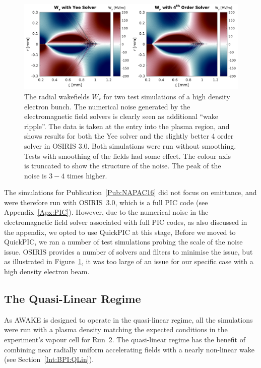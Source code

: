 \begin{figure}[hbt]
    \centering
    \includegraphics[width=0.999\linewidth]{figures/EMFSolverNoise}
    \caption{\label{Fig:SimA:EMFNoise}
        The radial wakefields $W_r$ for two test simulations of a high density electron bunch.
        The numerical noise generated by the electromagnetic field solvers is clearly seen as additional ``wake ripple''.
        The data is taken at the entry into the plasma region, and shows results for both the Yee solver and the slightly better 4 order solver in OSIRIS 3.0.
        Both simulations were run without smoothing.
        Tests with smoothing of the fields had some effect.
        The colour axis is truncated to show the structure of the noise.
        The peak of the noise is $3-4$ times higher.
    }
\end{figure}

The simulations for Publication~\ref{Pub:NAPAC16} did not focus on emittance, and were therefore run with OSIRIS~3.0, which is a full PIC code (see Appendix~\ref{Apx:PIC}).
However, due to the numerical noise in the electromagnetic field solver associated with full PIC codes, as also discussed in the appendix, we opted to use QuickPIC at this stage,
Before we moved to QuickPIC, we ran a number of test simulations probing the scale of the noise issue.
OSIRIS provides a number of solvers and filters to minimise the issue, but as illustrated in Figure~\ref{Fig:SimA:EMFNoise}, it was too large of an issue for our specific case with a high density electron beam.

\subsection{The Quasi-Linear Regime}
\label{SimA:QLin}

As AWAKE is designed to operate in the quasi-linear regime, all the simulations were run with a plasma density matching the expected conditions in the experiment's vapour cell for Run~2.
The quasi-linear regime has the benefit of combining near radially uniform accelerating fields with a nearly non-linear wake (see Section~\ref{Int:BPI:QLin}).

